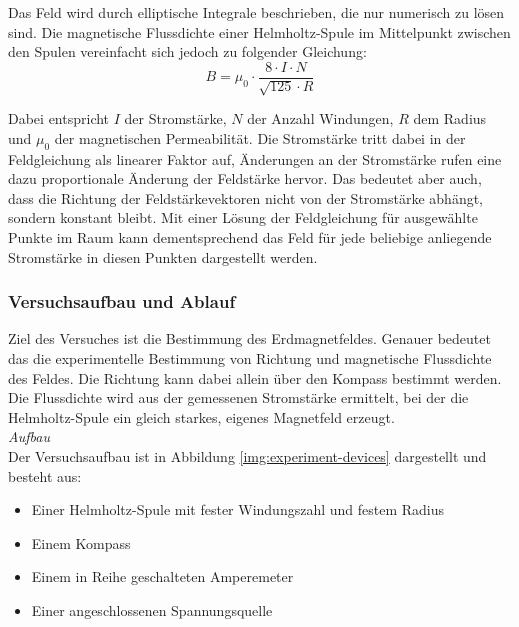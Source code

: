 Das Feld wird durch elliptische Integrale beschrieben, die nur numerisch zu lösen sind.
Die magnetische Flussdichte einer Helmholtz-Spule im Mittelpunkt zwischen den Spulen vereinfacht sich jedoch zu folgender Gleichung:
\begin{equation}
	\label{eq:mfield}
	B = \mu_{0} \cdot \frac{8 \cdot I \cdot N}{\sqrt{125} \cdot R}
\end{equation}

Dabei entspricht $I$ der Stromstärke, $N$ der Anzahl Windungen, $R$ dem Radius und $\mu_{0}$ der magnetischen Permeabilität. Die Stromstärke tritt dabei in der Feldgleichung als linearer Faktor auf, Änderungen an der Stromstärke rufen eine dazu proportionale Änderung der Feldstärke hervor. Das bedeutet aber auch, dass die Richtung der Feldstärkevektoren nicht von der Stromstärke abhängt, sondern konstant bleibt. Mit einer Lösung der Feldgleichung für ausgewählte Punkte im Raum kann dementsprechend das Feld für jede beliebige anliegende Stromstärke in diesen Punkten dargestellt werden.\\

\subsubsection{Versuchsaufbau und Ablauf}
Ziel des Versuches ist die Bestimmung des Erdmagnetfeldes. Genauer bedeutet das die experimentelle Bestimmung von Richtung und magnetische Flussdichte des Feldes. Die Richtung kann dabei allein über den Kompass bestimmt werden. Die Flussdichte wird aus der gemessenen Stromstärke ermittelt, bei der die Helmholtz-Spule ein gleich starkes, eigenes Magnetfeld erzeugt.\\

\textit{Aufbau}\\
Der Versuchsaufbau ist in Abbildung \ref{img:experiment-devices} dargestellt und besteht aus: 
\begin{itemize}
	\setlength{\itemsep}{-5pt}
	\item Einer Helmholtz-Spule mit fester Windungszahl und festem Radius
	\item Einem Kompass
	\item Einem in Reihe geschalteten Amperemeter
	\item Einer angeschlossenen Spannungsquelle
\end{itemize}

